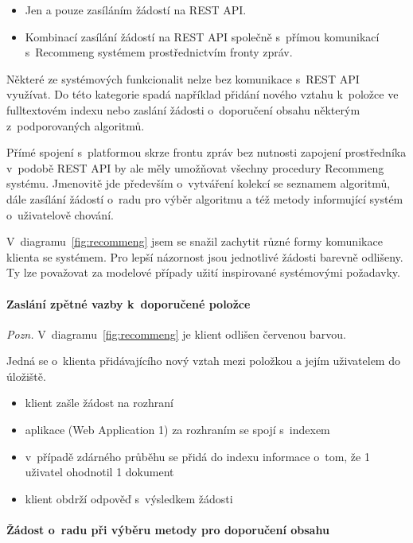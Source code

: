 \documentclass[thesis=M,czech]{FITthesis}[2014/05/07]
\begin{document}
\begin{itemize}
	\item Jen a pouze zasíláním žádostí na REST API.
	\item Kombinací zasílání žádostí na REST API společně s~přímou komunikací s~Recommeng systémem prostřednictvím fronty zpráv.
\end{itemize}

Některé ze systémových funkcionalit nelze bez komunikace s~REST API využívat. Do této kategorie spadá například přidání nového vztahu k~položce ve fulltextovém indexu nebo zaslání žádosti o~doporučení obsahu některým z~podporovaných algoritmů. 

Přímé spojení s~platformou skrze frontu zpráv bez nutnosti zapojení prostředníka v~podobě REST API by ale měly umožňovat všechny procedury Recommeng systému. Jmenovitě jde především o~vytváření kolekcí se seznamem algoritmů, dále zasílání žádostí o~radu pro výběr algoritmu a též metody informující systém o~uživatelově chování.

V~diagramu~\ref{fig:recommeng} jsem se snažil zachytit různé formy komunikace klienta se systémem. Pro lepší názornost jsou jednotlivé žádosti barevně odlišeny. Ty lze považovat za modelové případy užití inspirované systémovými požadavky.

\paragraph{Zaslání zpětné vazby k~doporučené položce}
\emph{Pozn.} V~diagramu~\ref{fig:recommeng} je klient odlišen červenou barvou. 

Jedná se o~klienta přidávajícího nový vztah mezi položkou a jejím uživatelem do úložiště.

\begin{itemize}
	\item klient zašle žádost na rozhraní
	\item aplikace (Web Application 1) za rozhraním se spojí s~indexem
	\item v~případě zdárného průběhu se přidá do indexu informace o~tom, že 1 uživatel ohodnotil 1 dokument
	\item klient obdrží odpověď s~výsledkem žádosti
\end{itemize}

\paragraph{Žádost o~radu při výběru metody pro doporučení obsahu}
\label{subsub:purple}
\end{document}
